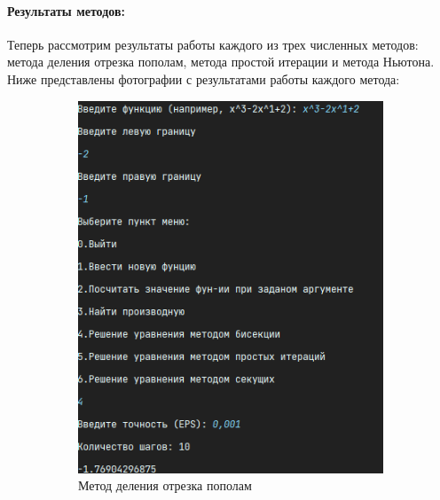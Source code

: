 \documentclass[12pt]{article}
\begin{document}
    \paragraph{Результаты методов:}

    Теперь рассмотрим результаты работы каждого из трех численных методов: метода деления отрезка пополам, метода простой итерации и метода Ньютона. Ниже представлены фотографии с результатами работы каждого метода:

    \begin{figure}
        \centering
        \begin{subfigure}{0.4\textwidth}
            \centering
            \includegraphics[width=\textwidth]{image/bisection_method}
            \caption{Метод деления отрезка пополам}
        \end{subfigure}
        \hfill
        \begin{subfigure}{0.4\textwidth}
            \centering

\end{subfigure}
\end{figure}
\end{document}
